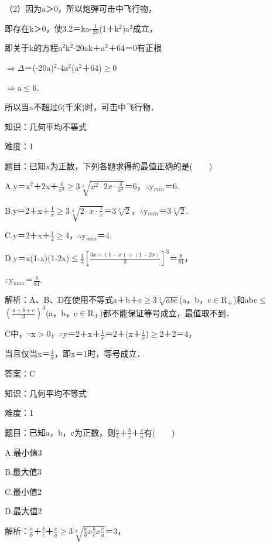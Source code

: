 \documentclass{article} %
\begin{document}
（2）因为a＞0，所以炮弹可击中飞行物，

即存在k＞0，使3.2＝ka-$\frac{1}{20}$(1＋k${}^{2}$)a${}^{2}$成立，

即关于k的方程a${}^{2}$k${}^{2}$-20ak＋a${}^{2}$＋64＝0有正根

$\mathrm{\Rightarrow }$$\Delta$＝(-20a)${}^{2}$-4a${}^{2}$(a${}^{2}$＋64)$\mathrm{\ge}$0

$\mathrm{\Rightarrow }$a$\mathrm{\le}$6.

所以当a不超过6(千米)时，可击中飞行物．




知识：几何平均不等式

难度：1

题目：已知x为正数，下列各题求得的最值正确的是(　　)

A.y＝x${}^{2}$＋2x＋$\frac{4}{x^3}$$\mathrm{\ge}$3$\sqrt[3]{x^2\cdot2x\cdot\frac{4}{x^3}}$＝6，$\mathrm{\therefore}$y${}_{min}$＝6.

B.y＝2＋x＋$\frac{1}{x}$$\mathrm{\ge}$$3\sqrt[3]{2\cdot x\cdot\frac{1}{x}}$＝$3\sqrt[3]{2}$，$\mathrm{\therefore}$y${}_{min}$＝$3\sqrt[3]{2}$.

C.y＝2＋x＋$\frac{1}{4}$$\mathrm{\ge}$4，$\mathrm{\therefore}$y${}_{min}$＝4.

D.y＝x(1-x)(1-2x)$\mathrm{\le}$$\frac{1}{3}[\frac{3x+(1-x)+(1-2x)}{3}]^3$＝$\frac{8}{81}$，

$\mathrm{\therefore}$y${}_{max}$＝$\frac{8}{81}$.

解析：A、B、D在使用不等式a＋b＋c$\mathrm{\ge}$3$\sqrt[3]{abc}$(a，b，c$\mathrm{\in}$R${}_{\textrm{＋}}$)和abc$\mathrm{\le}$$(\frac{a+b+c}{3})^3$(a，b，c$\mathrm{\in}$R${}_{\textrm{＋}}$)都不能保证等号成立，最值取不到．

C中，$\mathrm{\because}$x$\mathrm{>}$0，$\mathrm{\therefore}$y＝2＋x＋$\frac{1}{x}$＝2＋(x＋$\frac{1}{x}$)$\mathrm{\ge}$2＋2＝4，

当且仅当x＝$\frac{1}{x}$，即x＝1时，等号成立．

答案：C



知识：几何平均不等式

难度：1

题目：已知a，b，c为正数，则$\frac{a}{b}$＋$\frac{b}{c}$＋$\frac{c}{a}$有(　　)

A.最小值3　　　　　　  

B.最大值3  

C.最小值2  

D.最大值2

解析：$\frac{a}{b}$＋$\frac{b}{c}$＋$\frac{c}{a}$$\mathrm{\ge}$3$\sqrt[3]{\frac{a}{b}x\frac{b}{c}x\frac{c}{a}}$＝3，
\end{document}
